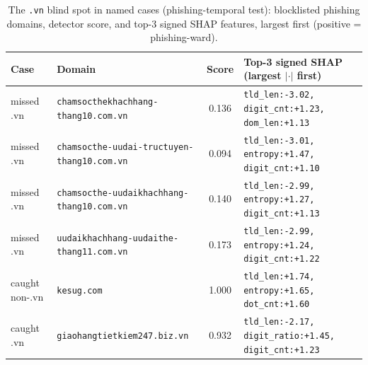 \begin{table}[t]\centering
\caption{The \texttt{.vn} blind spot in named cases (phishing-temporal test): blocklisted phishing domains, detector score, and top-3 signed SHAP features, largest first (positive = phishing-ward).}
\label{tab:cases}
\footnotesize\setlength{\tabcolsep}{5pt}
\begin{tabular}{l l c l}\toprule
Case & Domain & Score & Top-3 signed SHAP (largest $|\cdot|$ first) \\ \midrule
missed .vn & \texttt{chamsocthekhachhang-thang10.com.vn} & 0.136 & \texttt{tld\_len:-3.02,\, digit\_cnt:+1.23,\, dom\_len:+1.13} \\
missed .vn & \texttt{chamsocthe-uudai-tructuyen-thang10.com.vn} & 0.094 & \texttt{tld\_len:-3.01,\, entropy:+1.47,\, digit\_cnt:+1.10} \\
missed .vn & \texttt{chamsocthe-uudaikhachhang-thang10.com.vn} & 0.140 & \texttt{tld\_len:-2.99,\, entropy:+1.27,\, digit\_cnt:+1.13} \\
missed .vn & \texttt{uudaikhachhang-uudaithe-thang11.com.vn} & 0.173 & \texttt{tld\_len:-2.99,\, entropy:+1.24,\, digit\_cnt:+1.22} \\
caught non-.vn & \texttt{kesug.com} & 1.000 & \texttt{tld\_len:+1.74,\, entropy:+1.65,\, dot\_cnt:+1.60} \\
caught .vn & \texttt{giaohangtietkiem247.biz.vn} & 0.932 & \texttt{tld\_len:-2.17,\, digit\_ratio:+1.45,\, digit\_cnt:+1.23} \\
\bottomrule\end{tabular}\end{table}
